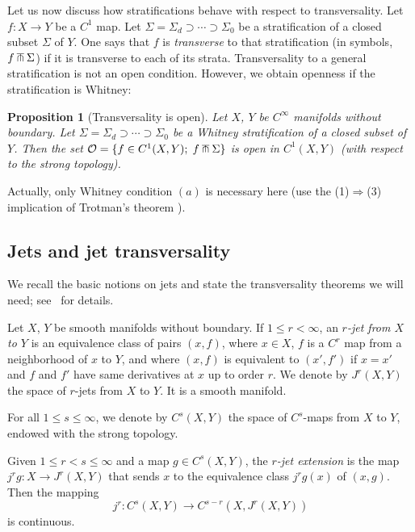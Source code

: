 \documentclass[10pt, a4paper]{amsart}
\theoremstyle{plain}
\newtheorem{prop}[lemma]{Proposition}
\theoremstyle{definition}
\theoremstyle{remark}
\theoremstyle{note}
\numberwithin{equation}{section}
\begin{document}
Let us now discuss how stratifications behave with respect to transversality. 
Let $f \colon X \to Y$ be a $C^1$ map.
Let ${\Sigma}={\Sigma}_d \supset\cdots \supset{\Sigma}_0$ be a stratification of a closed subset ${\Sigma}$ of $Y$. 
One says that $f$ is \emph{transverse} to that stratification 
(in symbols, $f{\;\;\makebox[0pt]{$\top$}\makebox[0pt]{\small $\cap$}\;\;} {\Sigma}$)
if it is transverse to each of its strata.
Transversality to a general stratification is not an open condition.
However, we obtain openness if the stratification is Whitney:

\begin{prop}[Transversality is open]\label{p.transversality open}
Let $X$, $Y$ be $C^\infty$ manifolds without boundary. Let
${\Sigma}={\Sigma}_d \supset\cdots \supset{\Sigma}_0$ be a Whitney stratification of a closed subset of $Y$. 
Then the set ${\mathcal{O}} = \{f \in C^1(X,Y) ; \;  f{\;\;\makebox[0pt]{$\top$}\makebox[0pt]{\small $\cap$}\;\;} {\Sigma}\}$ is open in $C^1(X,Y)$ (with respect to the 
strong topology). 
\end{prop}

Actually, only Whitney condition $(a)$ is necessary here
(use the (1)$\Rightarrow$(3) implication of Trotman's theorem \cite{Trotman_79}).

\subsection{Jets and jet transversality}

We recall the basic notions on jets 
and state the transversality theorems we will need;
see~\cite{Hirsch} for details.

Let $X$, $Y$ be smooth manifolds without boundary. 
If $1 \le r < \infty$, an \emph{$r$-jet from $X$ to $Y$} is an equivalence class of pairs $(x,f)$, where $x\in X$, $f$ is a $C^r$ map from a neighborhood of $x$ to $Y$, and where $(x,f)$ is equivalent to $(x',f')$ if $x=x'$ and $f$ and $f'$ have same derivatives at $x$ up to order $r$. 
We denote by $J^r(X,Y)$ the space of $r$-jets from $X$ to $Y$. 
It is a smooth manifold.

For all $1 \leq s \leq \infty$, we denote by $C^s(X,Y)$ the space of $C^s$-maps from $X$ to
$Y$, endowed with the 
strong topology.

Given $1\leq r < s \leq \infty$ and a map $g\in C^s(X,Y)$, 
the \emph{$r$-jet extension} is the map $j^r g \colon X \to J^r(X,Y)$ that sends $x$ 
to the equivalence class $j^r g(x)$ of $(x,g)$. 
Then the mapping 
$$
j^r\colon C^s(X,Y) \to C^{s-r}\left( X, J^r(X,Y) \right)
$$
is continuous.
\end{document}
